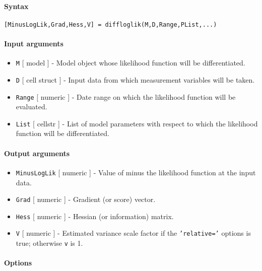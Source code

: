 


	\paragraph{Syntax}

\begin{verbatim}
[MinusLogLik,Grad,Hess,V] = diffloglik(M,D,Range,PList,...)
\end{verbatim}

\paragraph{Input arguments}

\begin{itemize}
\item
  \texttt{M} {[} model {]} - Model object whose likelihood function will
  be differentiated.
\item
  \texttt{D} {[} cell \textbar{} struct {]} - Input data from which
  measurement variables will be taken.
\item
  \texttt{Range} {[} numeric {]} - Date range on which the likelihood
  function will be evaluated.
\item
  \texttt{List} {[} cellstr {]} - List of model parameters with respect
  to which the likelihood function will be differentiated.
\end{itemize}

\paragraph{Output arguments}

\begin{itemize}
\item
  \texttt{MinusLogLik} {[} numeric {]} - Value of minus the likelihood
  function at the input data.
\item
  \texttt{Grad} {[} numeric {]} - Gradient (or score) vector.
\item
  \texttt{Hess} {[} numeric {]} - Hessian (or information) matrix.
\item
  \texttt{V} {[} numeric {]} - Estimated variance scale factor if the
  \texttt{'relative='} options is true; otherwise \texttt{v} is 1.
\end{itemize}

\paragraph{Options}

